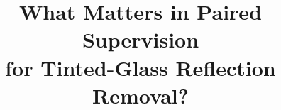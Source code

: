 \documentclass[conference]{IEEEtran}
\begin{document}
\title{What Matters in Paired Supervision\\ for Tinted-Glass Reflection Removal?}

\author{\\
}

\maketitle










\end{document}
